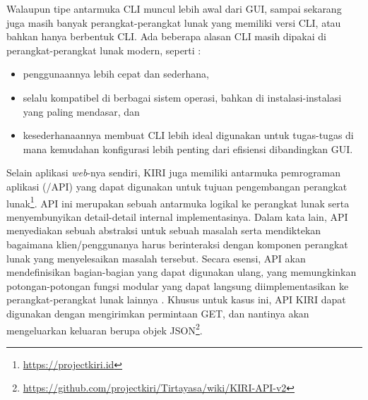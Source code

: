Walaupun tipe antarmuka CLI muncul lebih awal dari GUI, sampai sekarang juga masih banyak perangkat-perangkat lunak yang memiliki versi CLI, atau bahkan hanya berbentuk CLI. Ada beberapa alasan CLI masih dipakai di perangkat-perangkat lunak modern, seperti \cite{matthew:2007:beginninglinuxprogramming}:

\begin{itemize}
	\item penggunaannya lebih cepat dan sederhana,
	\item selalu kompatibel di berbagai sistem operasi, bahkan di instalasi-instalasi yang paling mendasar, dan
	\item kesederhanaannya membuat CLI lebih ideal digunakan untuk tugas-tugas di mana kemudahan konfigurasi lebih penting dari efisiensi dibandingkan GUI.
\end{itemize}

Selain aplikasi \textit{web}-nya sendiri, KIRI juga memiliki antarmuka pemrograman aplikasi (\api /API) yang dapat digunakan untuk tujuan pengembangan perangkat lunak\footnote{\href{https://projectkiri.id}{https://projectkiri.id}}. API ini merupakan sebuah antarmuka logikal ke perangkat lunak serta menyembunyikan detail-detail internal implementasinya. Dalam kata lain, API menyediakan sebuah abstraksi untuk sebuah masalah serta mendiktekan bagaimana klien/penggunanya harus berinteraksi dengan komponen perangkat lunak yang menyelesaikan masalah tersebut. Secara esensi, API akan mendefinisikan bagian-bagian yang dapat digunakan ulang, yang memungkinkan potongan-potongan fungsi modular yang dapat langsung diimplementasikan ke perangkat-perangkat lunak lainnya \cite{reddy:2011:apidesigncpp}. Khusus untuk kasus ini, API KIRI dapat digunakan dengan mengirimkan permintaan GET, dan nantinya akan mengeluarkan keluaran berupa objek JSON\footnote{\href{https://github.com/projectkiri/Tirtayasa/wiki/KIRI-API-v2}{https://github.com/projectkiri/Tirtayasa/wiki/KIRI-API-v2}}.

